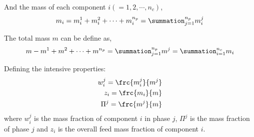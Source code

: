 \documentclass[12pt,a4paper,oneside]{report}%
\begin{document}
And the mass of each component $i\left(=1,2,\cdots,n_{c}\right)$,
\begin{equation}
m_{i} = m_{i}^{1} + m_{i}^{2} + \cdots + m_{i}^{n_{p}} = \summation_{j=1}^{n_{p}}m_{i}^{j}
\label{Eqn_MassBalance_Component}
\end{equation}

The total mass $m$ can be define as,
\begin{equation}
m - m^{1} + m^{2} + \cdots + m^{n_{p}} = \summation_{j=1}^{n_{p}}m^{j} = \summation_{i=1}^{n_{c}}m_{i}
\label{Eqn_MassBalance_Mass}
\end{equation}

Defining the intensive properties:
\begin{eqnarray}
w_{i}^{j} = \frc{m_{i}^{j}}{m^{j}} \label{Eqn_MassBalance_MassFraction} \\
z_{i} = \frc{m_{i}}{m} \label{Eqn_MassBalance_MassFractionFeeding} \\
\Pi^{j} = \frc{m^{j}}{m}\label{Eqn_MassBalance_PhaseMassFraction} 
\end{eqnarray}
where $w_{i}^{j}$ is the mass fraction of component $i$ in phase $j$, $\Pi^{j}$ is the mass fraction of phase $j$ and $z_{i}$ is the overall feed mass fraction of component $i$. 
\end{document}
